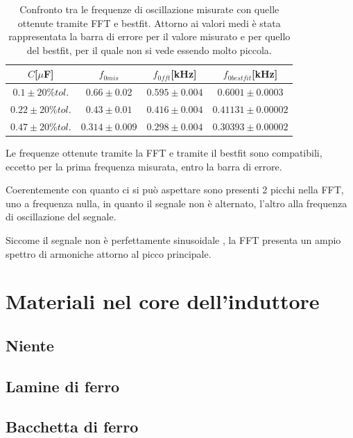 \documentclass{article}
\begin{document}
        \begin{table}[H]
            \centering
            \caption{Confronto tra le frequenze di oscillazione misurate con quelle ottenute tramite FFT e bestfit.
                    Attorno ai valori medi è stata rappresentata la barra di errore per il valore
                    misurato e per quello del bestfit, per il quale non si vede essendo molto piccola.}
                \begin{tabular}{cccc}
                    $C$[$\mu$F]          &$f_{0mis}$                &   $f_{0fft}$[kHz]       & $f_{0bestfit}$[kHz] \\
                    \hline
                    $0.1 \pm 20\%tol.$   &     $0.66 \pm 0.02$      & $0.595 \pm 0.004$       & $0.6001 \pm 0.0003$ \\
                    $0.22 \pm 20\%tol.$  &$0.43 \pm 0.01$           & $0.416 \pm 0.004$       & $0.41131\pm 0.00002$ \\
                    $0.47 \pm 20\%tol.$  &$0.314 \pm 0.009 $        &$0.298 \pm 0.004$        & $0.30393\pm 0.00002$ \\
                \end{tabular}
                \label{tab:osc_smor}

        \end{table}
    
    Le frequenze ottenute tramite la FFT e tramite il bestfit sono compatibili, 
    eccetto per la prima frequenza misurata, entro la barra di errore.

    Coerentemente con quanto ci si può aspettare sono presenti 2 picchi nella FFT,
    uno a frequenza nulla, in quanto il segnale non è alternato, l'altro
    alla frequenza di oscillazione del segnale.

    Siccome il segnale non è perfettamente sinusoidale , la FFT
    presenta un ampio spettro di armoniche attorno al picco principale.

\section{Materiali nel core dell'induttore}
    \subsection{Niente}
    \subsection{Lamine di ferro}
    \subsection{Bacchetta di ferro}
\end{document}
